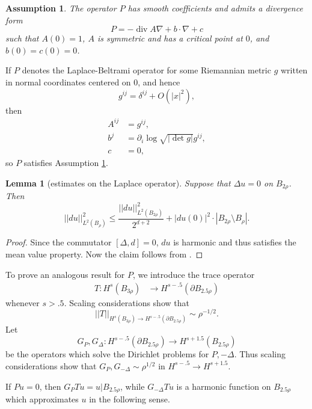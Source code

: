\documentclass[reqno,12pt,letterpaper]{amsart}
\DeclareMathOperator{\Div}{div}
\newtheorem{lemma}[theorem]{Lemma}
\newtheorem{assumption}[theorem]{Assumption}
\theoremstyle{definition}
\numberwithin{equation}{section}
\begin{document}
\begin{assumption}\label{nice elliptic operator}
The operator $P$ has smooth coefficients and admits a divergence form
$$P = -\Div A \nabla + b \cdot \nabla + c$$
such that $A(0) = 1$, $A$ is symmetric and has a critical point at $0$, and $b(0) = c(0) = 0$.
\end{assumption}

If $P$ denotes the Laplace-Beltrami operator for some Riemannian metric $g$ written in normal coordinates centered on $0$, and hence
$$g^{ij} = \delta^{ij} + O(|x|^2),$$
then
\begin{align*}
A^{ij} &= g^{ij},\\
b^j &= \partial_i \log \sqrt{|\det g|} g^{ij},\\
c &= 0,
\end{align*}
so $P$ satisfies Assumption \ref{nice elliptic operator}.

\begin{lemma}[estimates on the Laplace operator]\label{bootstrap Laplace}
Suppose that $\Delta u = 0$ on $B_{2\rho}$.
Then
$$||du||_{L^2(B_\rho)}^2 \leq \frac{||du||_{L^2(B_{2\rho})}^2}{2^{d + 2}} + |du(0)|^2 \cdot |B_{2\rho} \setminus B_\rho|.$$
\end{lemma}
\begin{proof}
Since the commutator $[\Delta, d] = 0$, $du$ is harmonic and thus satisfies the mean value property.
Now the claim follows from \cite[Lemma 4.1]{Miranda66}.
\end{proof}

To prove an analogous result for $P$, we introduce the trace operator
\begin{align*}
T: H^s(B_{3\rho}) &\to H^{s-.5}(\partial B_{2.5\rho})
\end{align*}
whenever $s > .5$.
Scaling considerations show that
$$||T||_{H^s(B_{3\rho}) \to H^{s - .5}(\partial B_{2.5\rho})} \sim \rho^{-1/2}.$$
Let
$$G_P, G_{\Delta}: H^{s - .5}(\partial B_{2.5\rho}) \to H^{s + 1.5}(B_{2.5\rho})$$
be the operators which solve the Dirichlet problems for $P,-\Delta$.
Thus scaling considerations show that $G_P, G_{-\Delta} \sim \rho^{1/2}$ in $H^{s - .5} \to H^{s + 1.5}$.

If $Pu = 0$, then $G_PTu = u|B_{2.5\rho}$, while $G_{-\Delta}Tu$ is a harmonic function on $B_{2.5\rho}$ which approximates $u$ in the following sense.
\end{document}
